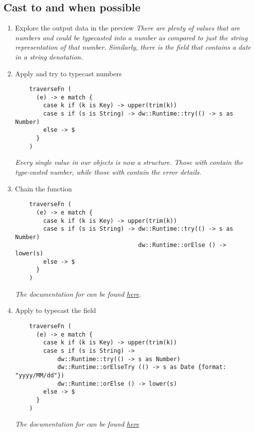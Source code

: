 \subsection{Cast to  and  when possible}
\begin{enumerate}[resume*]
\item Explore the output data in the preview
  \newline
  \emph{
    There are plenty of values that are numbers and could be typecasted into a number as compared to just the string representation of that number.  Similarly, there is the  field that contains a date in a string denotation.
  }
\item Apply  and try to typecast numbers
  \begin{verbatim}
    traverseFn (
      (e) -> e match {
        case k if (k is Key) -> upper(trim(k))
        case s if (s is String) -> dw::Runtime::try(() -> s as Number)
        else -> $
      }
    )
  \end{verbatim}
  \emph{
    Every single value in our objects is now a  structure.  Those with  contain the type-casted number, while those with  contain the error details.
  }
\item Chain the  function
  \begin{verbatim}
    traverseFn (
      (e) -> e match {
        case k if (k is Key) -> upper(trim(k))
        case s if (s is String) -> dw::Runtime::try(() -> s as Number)
                                   dw::Runtime::orElse () -> lower(s)
        else -> $
      }
    )
  \end{verbatim}
  \emph{
    The documentation for  can be found \href{https://docs.mulesoft.com/mule-runtime/4.3/dw-runtime-functions-orelse}{here}.
  }
\item Apply  to typecast the  field
  \begin{verbatim}
    traverseFn (
      (e) -> e match {
        case k if (k is Key) -> upper(trim(k))
        case s if (s is String) ->
            dw::Runtime::try(() -> s as Number)
            dw::Runtime::orElseTry (() -> s as Date {format: "yyyy/MM/dd"})
            dw::Runtime::orElse () -> lower(s)
        else -> $
      }
    )
  \end{verbatim}
  \emph{
    The documentation for  can be found \href{https://docs.mulesoft.com/mule-runtime/4.3/dw-runtime-functions-orelsetry}{here}
  }
\end{enumerate}
